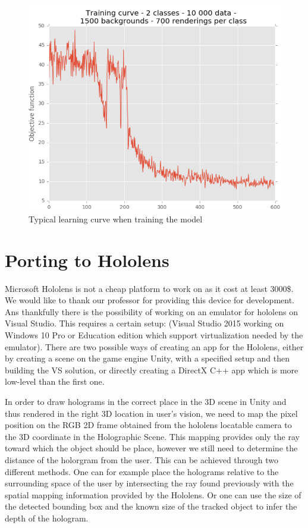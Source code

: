 \documentclass[10pt,twocolumn,letterpaper]{article}
\begin{document}
\begin{figure}
 \centering
 \includegraphics[scale=0.28]{LearningCurve}
 \caption{Typical learning curve when training the model}
 \label{learningCurve}
\end{figure}


\section{Porting to Hololens}
Microsoft Hololens is not a cheap platform to work on as it cost at least 3000\$. We would like to thank our professor for providing this device for development. Ans thankfully there is the possibility of working on an emulator for hololens on Visual Studio. This requires a certain setup: (Visual Studio 2015 working on Windows 10 Pro or Education edition which support virtualization needed by the emulator). There are two possible ways of creating an app for the Hololens, either by creating a scene on the game engine Unity, with a specified setup and then building the VS solution, or directly creating a DirectX C++ app which is more low-level than the first one.

In order to draw holograms in the correct place in the 3D scene in Unity and thus rendered in the right 3D location in user's vision, we need to map the pixel position on the RGB 2D frame obtained from the hololens locatable camera to the 3D coordinate in the Holographic Scene. This mapping provides only the ray toward which the object should be place, however we still need to determine the distance of the holorgram from the user. This can be achieved through two different methods. One can for example place the holograms relative to the surrounding space of the user by intersecting the ray found previously with the spatial mapping information provided by the Hololens. Or one can use the size of the detected bounding box and the known size of the tracked object to infer the depth of the hologram. 
\end{document}
